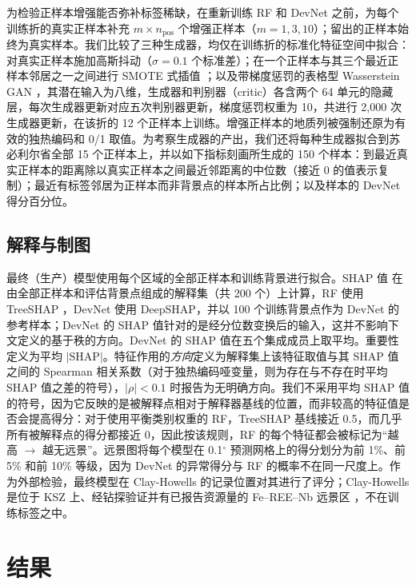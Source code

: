 \documentclass[pdflatex,sn-apa]{sn-jnl}
\begin{document}
为检验正样本增强能否弥补标签稀缺，在重新训练 RF 和 DevNet 之前，为每个训练折的真实正样本补充 $m \times n_{\mathrm{pos}}$ 个增强正样本（$m = 1, 3, 10$）；留出的正样本始终为真实样本。我们比较了三种生成器，均仅在训练折的标准化特征空间中拟合：对真实正样本施加高斯抖动（$\sigma = 0.1$ 个标准差）；在一个正样本与其三个最近正样本邻居之一之间进行 SMOTE 式插值 \citep{Chawla2002}；以及带梯度惩罚的表格型 Wasserstein GAN \citep[WGAN-GP;][]{Goodfellow2014,Arjovsky2017,Gulrajani2017}，其潜在输入为八维，生成器和判别器（critic）各含两个 64 单元的隐藏层，每次生成器更新对应五次判别器更新，梯度惩罚权重为 10，共进行 2,000 次生成器更新，在该折的 12 个正样本上训练。增强正样本的地质列被强制还原为有效的独热编码和 0/1 取值。为考察生成器的产出，我们还将每种生成器拟合到苏必利尔省全部 15 个正样本上，并以如下指标刻画所生成的 150 个样本：到最近真实正样本的距离除以真实正样本之间最近邻距离的中位数（接近 0 的值表示复制）；最近有标签邻居为正样本而非背景点的样本所占比例；以及样本的 DevNet 得分百分位。

\subsection{解释与制图}\label{sec:shap}

最终（生产）模型使用每个区域的全部正样本和训练背景进行拟合。SHAP 值 \citep{Lundberg2017} 在由全部正样本和评估背景点组成的解释集（共 200 个）上计算，RF 使用 TreeSHAP \citep{Lundberg2020}，DevNet 使用 DeepSHAP，并以 100 个训练背景点作为 DevNet 的参考样本；DevNet 的 SHAP 值针对的是经分位数变换后的输入，这并不影响下文定义的基于秩的方向。DevNet 的 SHAP 值在五个集成成员上取平均。重要性定义为平均 $|$SHAP$|$。特征作用的\emph{方向}定义为解释集上该特征取值与其 SHAP 值之间的 Spearman 相关系数（对于独热编码哑变量，则为存在与不存在时平均 SHAP 值之差的符号），$|\rho| < 0.1$ 时报告为无明确方向。我们不采用平均 SHAP 值的符号，因为它反映的是被解释点相对于解释器基线的位置，而非较高的特征值是否会提高得分：对于使用平衡类别权重的 RF，TreeSHAP 基线接近 0.5，而几乎所有被解释点的得分都接近 0，因此按该规则，RF 的每个特征都会被标记为“越高 $\rightarrow$ 越无远景”。远景图将每个模型在 0.1$^\circ$ 预测网格上的得分划分为前 1\%、前 5\% 和前 10\% 等级，因为 DevNet 的异常得分与 RF 的概率不在同一尺度上。作为外部检验，最终模型在 Clay-Howells 的记录位置对其进行了评分；Clay-Howells 是位于 KSZ 上、经钻探验证并有已报告资源量的 Fe--REE--Nb 远景区 \citep{OGS2011}，不在训练标签之中。

\section{结果}\label{sec:results}
\end{document}
